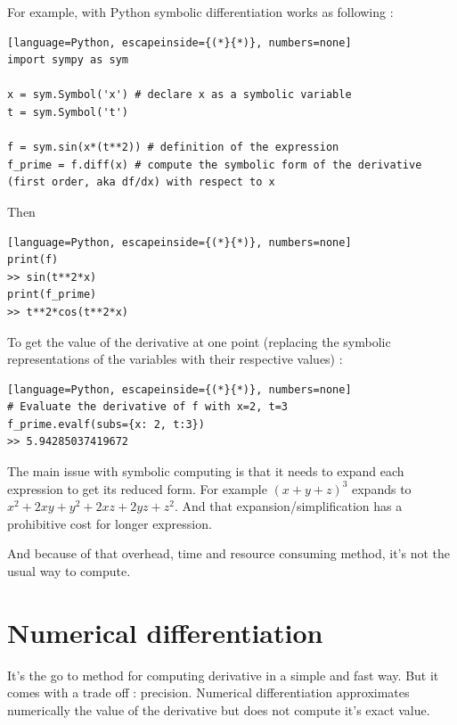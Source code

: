 \documentclass[12pt]{article}
\begin{document}
For example, with Python symbolic differentiation works as following :

\begin{lstlisting}[language=Python, escapeinside={(*}{*)}, numbers=none]
import sympy as sym

x = sym.Symbol('x') # declare x as a symbolic variable
t = sym.Symbol('t')

f = sym.sin(x*(t**2)) # definition of the expression
f_prime = f.diff(x) # compute the symbolic form of the derivative (first order, aka df/dx) with respect to x
\end{lstlisting}

Then

\begin{lstlisting}[language=Python, escapeinside={(*}{*)}, numbers=none]
print(f)
>> sin(t**2*x)
print(f_prime)
>> t**2*cos(t**2*x)
\end{lstlisting}

To get the value of the derivative at one point (replacing the symbolic representations of the variables with their respective values) :

\begin{lstlisting}[language=Python, escapeinside={(*}{*)}, numbers=none]
# Evaluate the derivative of f with x=2, t=3
f_prime.evalf(subs={x: 2, t:3})
>> 5.94285037419672
\end{lstlisting}

The main issue with symbolic computing is that it needs to expand each expression to get its reduced form. For example $(x+y+z)^3$ expands to $x^2+2xy+y^2+2xz+2yz+z^2$. And that expansion/simplification has a prohibitive cost for longer expression.

And because of that overhead, time and resource consuming method, it's not the usual way to compute.

%
%


\section{Numerical differentiation}

It's the go to method for computing derivative in a simple and fast way. But it comes with a trade off : precision. Numerical differentiation approximates numerically the value of the derivative but does not compute it's exact value.
\end{document}
